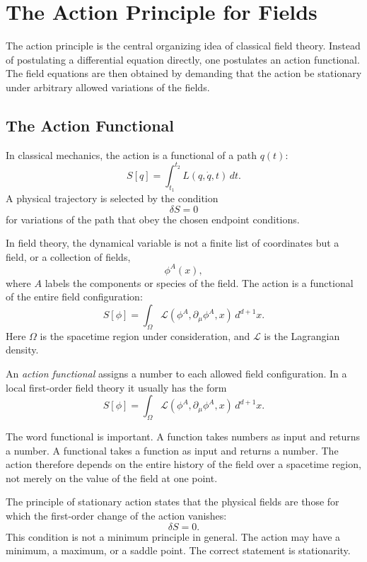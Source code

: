\chapter{The Action Principle for Fields}

\begin{remarkbox}
The action principle is the central organizing idea of classical field theory.
Instead of postulating a differential equation directly, one postulates an
action functional. The field equations are then obtained by demanding that the
action be stationary under arbitrary allowed variations of the fields.
\end{remarkbox}

\section{The Action Functional}

In classical mechanics, the action is a functional of a path \(q(t)\):
\[
    S[q]=\int_{t_1}^{t_2}L(q,\dot q,t)\,dt.
\]
A physical trajectory is selected by the condition
\[
    \delta S=0
\]
for variations of the path that obey the chosen endpoint conditions.

In field theory, the dynamical variable is not a finite list of coordinates but
a field, or a collection of fields,
\[
    \phi^A(x),
\]
where \(A\) labels the components or species of the field. The action is a
functional of the entire field configuration:
\[
    S[\phi]=\int_\Omega \mathcal{L}(\phi^A,\partial_\mu\phi^A,x)\,d^{d+1}x.
\]
Here \(\Omega\) is the spacetime region under consideration, and
\(\mathcal{L}\) is the Lagrangian density.

\begin{definitionbox}
An \emph{action functional} assigns a number to each allowed field
configuration. In a local first-order field theory it usually has the form
\[
    S[\phi]=\int_\Omega \mathcal{L}(\phi^A,\partial_\mu\phi^A,x)\,d^{d+1}x.
\]
\end{definitionbox}

The word functional is important. A function takes numbers as input and returns
a number. A functional takes a function as input and returns a number. The action
therefore depends on the entire history of the field over a spacetime region,
not merely on the value of the field at one point.

The principle of stationary action states that the physical fields are those
for which the first-order change of the action vanishes:
\[
    \delta S=0.
\]
This condition is not a minimum principle in general. The action may have a
minimum, a maximum, or a saddle point. The correct statement is stationarity.

